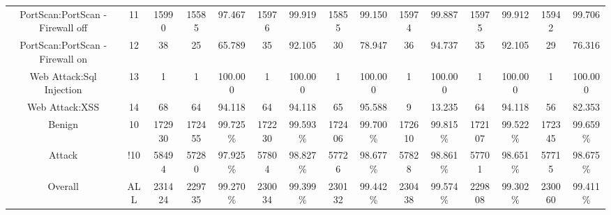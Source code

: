 \begin{table}[htb]
\begin{tabular}{@{}ccccccccccccccc@{}}
        PortScan:PortScan - Firewall off &  11 &  15990 &  15585 &  97.467 &  15976 &  99.919 &  15855 &  99.150 &  15974 &  99.887 &  15975 &  99.912 &  15942 &  99.706 \\
        PortScan:PortScan - Firewall on &  12 &  38 &  25 &  65.789 &  35 &  92.105 &  30 &  78.947 &  36 &  94.737 &  35 &  92.105 &  29 &  76.316 \\
        Web Attack:Sql Injection &  13 &  1 &  1 &  100.000 &  1 &  100.000 &  1 &  100.000 &  1 &  100.000 &  1 &  100.000 &  1 &  100.000 \\
        Web Attack:XSS &  14 &  68 &  64 &  94.118 &  64 &  94.118 &  65 &  95.588 &  9 &  13.235 &  64 &  94.118 &  56 &  82.353 \\
        Benign &  10 &  172930 &  172455 &  99.725\% &  172230 &  99.593\% &  172406 &  99.700\% &  172610 &  99.815\% &  172107 &  99.522\% &  172345 &  99.659\% \\
        Attack &  !10 &  58494 &  57280 &  97.925\% &  57804 &  98.827\% &  57726 &  98.677\% &  57828 &  98.861\% &  57701 &  98.651\% &  57715 &  98.675\% \\
        Overall &  ALL &  231424 &  229735 &  99.270\% &  230034 &  99.399\% &  230132 &  99.442\% &  230438 &  99.574\% &  229808 &  99.302\% &  230060 &  99.411\% \\
        \bottomrule
    \end{tabular}
\end{table}
